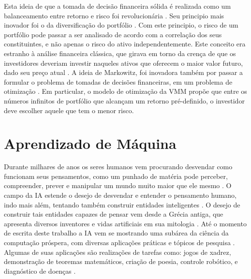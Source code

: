 Esta ideia de que a tomada de decisão financeira sólida é realizada como um balanceamento entre retorno e risco foi revolucionária \cite{kolm201460}. Seu principio mais inovador foi o da diversificação do portfólio \cite{kolm201460}. Com este principio, o risco de um portfólio pode passar a ser analisado de acordo com a correlação dos seus constituintes, e não apenas o risco do ativo independentemente. Este conceito era estranho à análise financeira clássica, que girava em torno da crença de que os investidores deveriam investir naqueles ativos que oferecem o maior valor futuro, dado seu preço atual \cite{kolm201460}. A ideia de Markowitz, foi inovadora também por passar a formular o problema de tomadas de decisões financeiras, em um problema de otimização \cite{kolm201460}. Em particular, o modelo de otimização da \acrshort{VMM} propõe que entre os números infinitos de portfólio que alcançam um retorno pré-definido, o investidor deve escolher aquele que tem o menor risco.

\section{Aprendizado de Máquina} 

Durante milhares de anos os seres humanos vem procurando desvendar como funcionam seus pensamentos, como um punhado de matéria pode perceber, compreender, prever e manipular um mundo muito maior que ele mesmo \cite{modern_approach}. O campo da \acrfull{IA} estende o desejo de desvendar e entender o pensamento humano, indo mais além, tentando também construir entidades inteligentes \cite{modern_approach}. O desejo de construir tais entidades capazes de pensar vem desde a Grécia antiga, que apresenta diversos inventores e vidas artificiais em sua mitologia \cite{deep_learning}. Até o momento de escrita deste trabalho a \acrshort{IA} vem se mostrando uma subárea da ciência da computação próspera, com diversas aplicações práticas e tópicos de pesquisa \cite{deep_learning}. Algumas de suas aplicações são realizações de tarefas como: jogos de xadrez, demonstração de teoremas matemáticos, criação de poesia, controle robótico, e diagnóstico de doenças \cite{modern_approach}.

